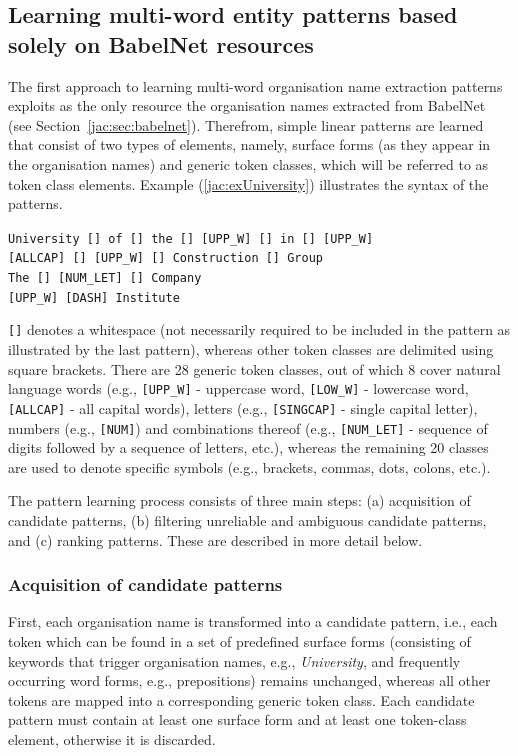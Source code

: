 \documentclass[output=paper]{langsci/langscibook}
\begin{document}
\subsection{Learning multi-word entity patterns based solely on BabelNet resources}
\label{jac:sec:babelnet-only-derived-patterns}

The first approach to learning multi-word organisation name extraction patterns exploits as the only resource the organisation names extracted from BabelNet (see Section~\ref{jac:sec:babelnet}). Therefrom, simple linear patterns are learned that consist of two types of elements, namely, surface forms (as they appear in the organisation names) and generic token classes, which will be referred to as token class elements. Example (\ref{jac:exUniversity}) illustrates the syntax of the patterns.

\ea\label{jac:exUniversity}
    \texttt{University [] of [] the [] [UPP\_W] [] in [] [UPP\_W]} \\
    \texttt{[ALLCAP] [] [UPP\_W] [] Construction [] Group} \\
    \texttt{The [] [NUM\_LET] [] Company} \\
    \texttt{[UPP\_W] [DASH] Institute}
\z

\noindent \verb+[]+ denotes a whitespace (not necessarily required to be included in the pattern as illustrated by the last pattern), whereas other token classes are delimited using square brackets. There are 28 generic token classes, out of which 8 cover natural language words (e.g., \verb+[UPP_W]+ - uppercase word, \verb+[LOW_W]+ - lowercase word, \verb+[ALLCAP]+ - all capital words), letters (e.g., \verb+[SINGCAP]+ - single capital letter), numbers (e.g., \verb+[NUM]+) and combinations thereof (e.g., \verb+[NUM_LET]+ - sequence of digits followed by a sequence of letters, etc.), whereas the remaining 20 classes are used to denote specific symbols (e.g., brackets, commas, dots, colons, etc.). 

The pattern learning process consists of three main steps: (a) acquisition of candidate patterns, (b) filtering unreliable and ambiguous candidate patterns, and (c) ranking patterns. These are described in more detail below.

\subsubsection{Acquisition of candidate patterns} First, each organisation name is transformed into a candidate pattern, i.e., each token which can be found in a set of predefined surface forms (consisting of keywords that trigger organisation names, e.g.,  \textit{University}, and frequently occurring word forms, e.g., prepositions) remains unchanged, whereas all other tokens are mapped into a corresponding generic token class. Each candidate pattern must contain at least one surface form and at least one token-class element,
otherwise it is discarded.
\end{document}
